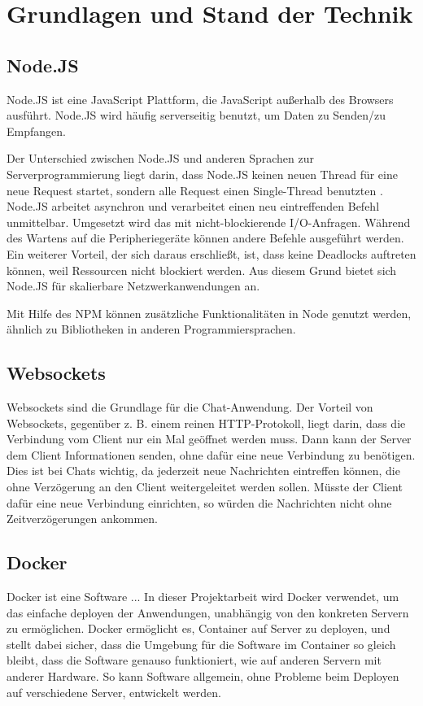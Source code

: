 
\chapter{Grundlagen und Stand der Technik}\label{cha:Grundlagen}
\section{Node.JS}\label{sec:Node.JS}
Node.JS ist eine JavaScript Plattform, die JavaScript außerhalb des Browsers ausführt. Node.JS wird häufig serverseitig benutzt, um Daten zu Senden/zu Empfangen. \cite{Node.2019}

Der Unterschied zwischen Node.JS und anderen Sprachen zur Serverprogrammierung liegt darin, dass Node.JS keinen neuen Thread für eine neue Request startet, sondern alle Request einen Single-Thread benutzten \cite[vgl.][3]{Holmes.2013}. Node.JS arbeitet asynchron und verarbeitet einen neu eintreffenden Befehl unmittelbar. Umgesetzt wird das mit nicht-blockierende I/O-Anfragen. Während des Wartens auf die Peripheriegeräte können andere Befehle ausgeführt werden. Ein weiterer Vorteil, der sich daraus erschließt, ist, dass keine Deadlocks auftreten können, weil Ressourcen nicht blockiert werden. Aus diesem Grund bietet sich Node.JS für skalierbare Netzwerkanwendungen an. \cite[vgl.][4]{Holmes.2013}

Mit Hilfe des \acf{NPM} können zusätzliche Funktionalitäten in Node genutzt werden, ähnlich zu Bibliotheken in anderen Programmiersprachen.

\section{Websockets}\label{sec:Websockets}
Websockets sind die Grundlage für die Chat-Anwendung. Der Vorteil von Websockets, gegenüber z. B. einem reinen \ac{HTTP}-Protokoll, liegt darin, dass die Verbindung vom Client nur ein Mal geöffnet werden muss. Dann kann der Server dem Client Informationen senden, ohne dafür eine neue Verbindung zu benötigen. Dies ist bei Chats wichtig, da jederzeit neue Nachrichten eintreffen können, die ohne Verzögerung an den Client weitergeleitet werden sollen. Müsste der Client dafür eine neue Verbindung einrichten, so würden die Nachrichten nicht ohne Zeitverzögerungen ankommen.
\section{Docker}\label{sec:Docker}
Docker ist eine Software ... In dieser Projektarbeit wird Docker verwendet, um das einfache deployen der Anwendungen, unabhängig von den konkreten Servern zu ermöglichen. Docker ermöglicht es, Container auf Server zu deployen, und stellt dabei sicher, dass die Umgebung für die Software im Container so gleich bleibt, dass die Software genauso funktioniert, wie auf anderen Servern mit anderer Hardware. So kann Software allgemein, ohne Probleme beim Deployen auf verschiedene Server, entwickelt werden.
